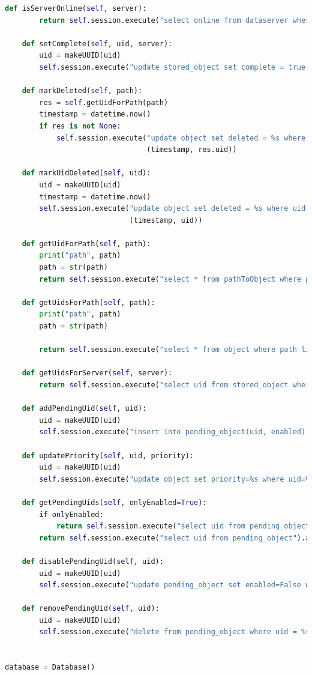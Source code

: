 \documentclass[11pt,a4paper,english]{article}
\begin{document}
\begin{lstlisting}[language=Python, title=Codice]
    def isServerOnline(self, server):
        return self.session.execute("select online from dataserver where server = %s", (server, )).one().online

    def setComplete(self, uid, server):
        uid = makeUUID(uid)
        self.session.execute("update stored_object set complete = true where uid = %s and server = %s", (uid, server))

    def markDeleted(self, path):
        res = self.getUidForPath(path)
        timestamp = datetime.now()
        if res is not None:
            self.session.execute("update object set deleted = %s where uid = %s",
                                 (timestamp, res.uid))

    def markUidDeleted(self, uid):
        uid = makeUUID(uid)
        timestamp = datetime.now()
        self.session.execute("update object set deleted = %s where uid = %s",
                             (timestamp, uid))

    def getUidForPath(self, path):
        print("path", path)
        path = str(path)
        return self.session.execute("select * from pathToObject where path = %s", (path, )).one()

    def getUidsForPath(self, path):
        print("path", path)
        path = str(path)

        return self.session.execute("select * from object where path like %s", (path, )).all()

    def getUidsForServer(self, server):
        return self.session.execute("select uid from stored_object where server = %s allow filtering", (server, ))

    def addPendingUid(self, uid):
        uid = makeUUID(uid)
        self.session.execute("insert into pending_object(uid, enabled) values (%s, True)", (uid, ))

    def updatePriority(self, uid, priority):
        uid = makeUUID(uid)
        self.session.execute("update object set priority=%s where uid=%s", (priority, uid))

    def getPendingUids(self, onlyEnabled=True):
        if onlyEnabled:
            return self.session.execute("select uid from pending_object where enabled=True allow filtering").all()
        return self.session.execute("select uid from pending_object").all()

    def disablePendingUid(self, uid):
        uid = makeUUID(uid)
        self.session.execute("update pending_object set enabled=False where uid = %s", (uid, ))

    def removePendingUid(self, uid):
        uid = makeUUID(uid)
        self.session.execute("delete from pending_object where uid = %s", (uid, ))


database = Database()
\end{lstlisting}
\end{document}
